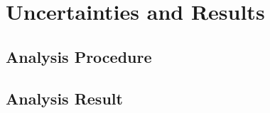 \chapter{Uncertainties and Results}
\label{analysis_chapter}

\section{Analysis Procedure}
\label{anaproc}


\section{Analysis Result}
\label{neymanana}

